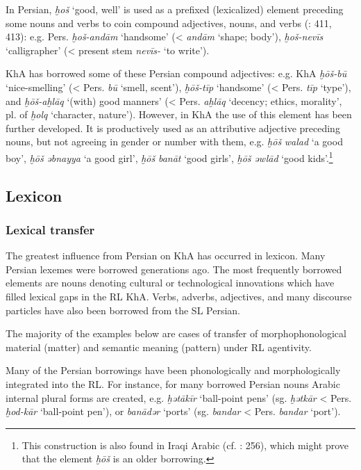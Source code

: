 \documentclass[output=paper,nonflat]{langsci/langscibook}
\begin{document}
In Persian, \textit{ḫoš} ‘good, well’ is used as a prefixed (lexicalized) element preceding some nouns and verbs to coin compound adjectives, nouns, and verbs (\citealt{Majidi1990}: 411, 413): e.g. Pers. \textit{ḫoš-andām} ‘handsome’ (< \textit{andām} ‘shape; body’), \textit{ḫoš-nevīs} ‘calligrapher’ (< present stem \textit{nevīs-} ‘to write’).

KhA has borrowed some of these Persian compound adjectives: e.g. KhA \textit{ḫōš-bū} ‘nice-smelling’ (< Pers. \textit{bū} ‘smell, scent’), \textit{ḫōš-tīp} ‘handsome’ (< Pers. \textit{tīp} ‘type’), and \textit{ḫōš-aḫlāq} ‘(with) good manners’ (< Pers. \textit{aḫlāq} ‘decency; ethics, morality’, pl. of \textit{ḫolq} ‘character, nature’). However, in KhA the use of this element has been further developed. It is productively used as an attributive adjective preceding nouns, but not agreeing in gender or number with them, e.g. \textit{ḫōš} \textit{walad} ‘a good boy’, \textit{ḫōš} \textit{əbnayya} ‘a good girl’, \textit{ḫōš} \textit{banāt} ‘good girls’, \textit{ḫōš} \textit{əwlād} ‘good kids’.\footnote{This construction is also found in Iraqi Arabic (cf. \citealt{Erwin1963}: 256), which might prove that the element \textit{ḫōš} is an older borrowing.}



\subsection{Lexicon}
\subsubsection{Lexical transfer}

The greatest influence from Persian on KhA has occurred in lexicon. Many Persian lexemes were borrowed generations ago. The most frequently borrowed elements are nouns denoting cultural or technological innovations which have filled lexical gaps in the RL KhA. Verbs, adverbs, adjectives, and many discourse particles have also been borrowed from the SL Persian.

The majority of the examples below are cases of transfer of morphophonological material (matter) and semantic meaning (pattern) under RL agentivity. 

Many of the Persian borrowings have been phonologically and morphologically integrated into the RL. For instance, for many borrowed Persian nouns Arabic internal plural forms are created, e.g. \textit{ḫətākīr} ‘ball-point pens’ (sg. \textit{ḫətkār} < Pers. \textit{ḫod-kār} ‘ball-point pen’), or \textit{banādər} ‘ports’ (sg. \textit{bandar} < Pers. \textit{bandar} ‘port’).
\end{document}
